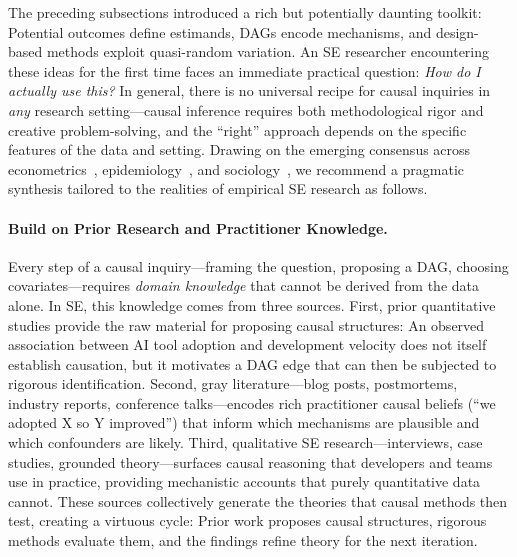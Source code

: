 The preceding subsections introduced a rich but potentially daunting toolkit: Potential outcomes define estimands, DAGs encode mechanisms, and design-based methods exploit quasi-random variation.
An SE researcher encountering these ideas for the first time faces an immediate practical question: \emph{How do I actually use this?}
In general, there is no universal recipe for causal inquiries in \emph{any} research setting---causal inference requires both methodological rigor and creative problem-solving, and the ``right'' approach depends on the specific features of the data and setting.
Drawing on the emerging consensus across econometrics~\cite{imbens2020potential, angrist2010credibility}, epidemiology~\cite{hernan2020causal}, and sociology~\cite{lundberg2021estimand}, we recommend a pragmatic synthesis tailored to the realities of empirical SE research as follows.

\paragraph{Build on Prior Research and Practitioner Knowledge.}
\label{sec:stance-prior-research}
Every step of a causal inquiry---framing the question, proposing a DAG, choosing covariates---requires \emph{domain knowledge} that cannot be derived from the data alone.
In SE, this knowledge comes from three sources.
First, prior quantitative studies provide the raw material for proposing causal structures: An observed association between AI tool adoption and development velocity does not itself establish causation, but it motivates a DAG edge that can then be subjected to rigorous identification.
Second, gray literature---blog posts, postmortems, industry reports, conference talks---encodes rich practitioner causal beliefs (``we adopted X so Y improved'') that inform which mechanisms are plausible and which confounders are likely.
Third, qualitative SE research---interviews, case studies, grounded theory---surfaces causal reasoning that developers and teams use in practice, providing mechanistic accounts that purely quantitative data cannot.
These sources collectively generate the theories that causal methods then test, creating a virtuous cycle: Prior work proposes causal structures, rigorous methods evaluate them, and the findings refine theory for the next iteration.

